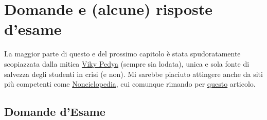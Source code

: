 \chapter{Domande e (alcune) risposte d'esame}
La maggior parte di questo e del prossimo capitolo è stata spudoratamente scopiazzata dalla mitica \href{http://it.wikipedia.org/wiki/Pagina_principale}{Viky Pedya} (sempre sia lodata), unica e sola fonte di salvezza degli studenti in crisi (e non). Mi sarebbe piaciuto attingere anche da siti più competenti come \href{http://nonciclopedia.wikia.com/wiki/Pagina_principale}{Nonciclopedia}, cui comunque rimando per \href{http://nonciclopedia.wikia.com/wiki/Motore_a_gatto_imburrato}{questo} articolo.


	\section{Domande d'Esame}
